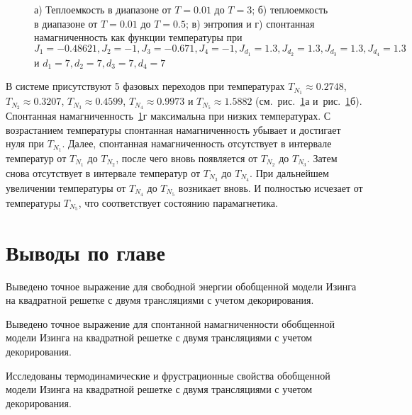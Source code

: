  \begin{figure}[h]
	\begin{minipage}{0.47\linewidth}
	\end{minipage}
	\hfill
	\begin{minipage}{0.47\linewidth}
	\end{minipage}
		\vfill
	\begin{minipage}{0.47\linewidth}
	\end{minipage}
	\hfill
	\begin{minipage}{0.47\linewidth}
	\end{minipage}
	\caption{а) Теплоемкость в диапазоне от $T=0.01$ до $T=3$; б) теплоемкость в диапазоне от $T=0.01$ до $T=0.5$; в) энтропия и г) спонтанная намагниченность как функции температуры при $J_1 = -0.48621, J_2 = -1, J_3 = -0.671, J_4 = -1, J_{d_1} = 1.3, J_{d_2} = 1.3, J_{d_3} = 1.3, J_{d_4} = 1.3$ и $d_1 = 7, d_2 = 7, d_3 = 7, d_4 = 7$}
	\label{5trans}
\end{figure}

В системе присутствуют 5 фазовых переходов при температурах $T_{N_1} \approx 0.2748$, $T_{N_2} \approx 0.3207$, $T_{N_3} \approx 0.4599$, $T_{N_4} \approx 0.9973$ и $T_{N_5} \approx 1.5882$ (см.~рис.~\ref{5trans}а и~рис.~\ref{5trans}б). Спонтанная намагниченность~\ref{5trans}г максимальна при низких температурах. С возрастанием температуры спонтанная намагниченность убывает и достигает нуля при $T_{N_1}$. Далее, спонтанная намагниченность отсутствует в интервале температур от $T_{N_1}$ до $T_{N_2}$, после чего вновь появляется от $T_{N_2}$ до $T_{N_3}$. Затем снова отсутствует в интервале температур от $T_{N_3}$ до $T_{N_4}$. При дальнейшем увеличении температуры от $T_{N_4}$ до $T_{N_5}$ возникает вновь. И полностью исчезает от температуры $T_{N_5}$, что соответствует состоянию парамагнетика. 

\section{Выводы по главе}

Выведено точное выражение для свободной энергии обобщенной модели Изинга на квадратной решетке с двумя трансляциями с учетом декорирования.

Выведено точное выражение для спонтанной намагниченности обобщенной модели Изинга на квадратной решетке с двумя трансляциями с учетом декорирования.

Исследованы термодинамические и фрустрационные свойства обобщенной модели Изинга на квадратной решетке с двумя трансляциями с учетом декорирования.

\FloatBarrier